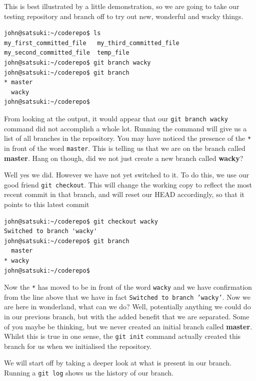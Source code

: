 This is best illustrated by a little demonstration, so we are going to take our testing repository and branch off to try out new, wonderful and wacky things.

\begin{Verbatim}
john@satsuki:~/coderepo$ ls
my_first_committed_file   my_third_committed_file
my_second_committed_file  temp_file
john@satsuki:~/coderepo$ git branch wacky
john@satsuki:~/coderepo$ git branch
* master
  wacky
john@satsuki:~/coderepo$ 
\end{Verbatim}

From looking at the output, it would appear that our \texttt{git branch wacky} command did not accomplish a whole lot.  Running the  command will give us a list of all branches in the repository.  You may have noticed the presence of the \texttt{*} in front of the word \texttt{master}.  This is telling us that we are on the branch called \textbf{master}.  Hang on though, did we not just create a new branch called \textbf{wacky}?  

Well yes we did.  However we have not yet switched to it.  To do this, we use our good friend \texttt{git checkout}.  This will change the working copy to reflect the most recent commit in that branch, and will reset our HEAD accordingly, so that it points to this latest commit

\begin{Verbatim}
john@satsuki:~/coderepo$ git checkout wacky
Switched to branch 'wacky'
john@satsuki:~/coderepo$ git branch
  master
* wacky
john@satsuki:~/coderepo$ 
\end{Verbatim}

Now the \texttt{*} has moved to be in front of the word \texttt{wacky} and we have confirmation from the line above that we have in fact \texttt{Switched to branch 'wacky'}.  Now we are here in wonderland, what can we do?  Well, potentially anything we could do in our previous branch, but with the added benefit that we are separated.  Some of you maybe be thinking, but we never created an initial branch called \textbf{master}.  Whilst this is true in one sense, the \texttt{git init} command actually created this branch for us when we initialised the repository.

We will start off by taking a deeper look at what is present in our branch.  Running a \texttt{git log} shows us the history of our branch.  

